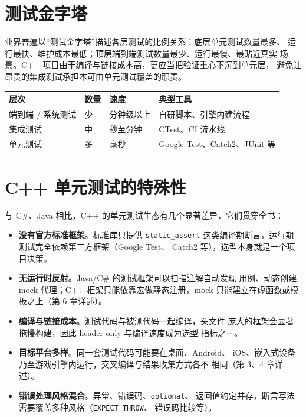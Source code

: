 \documentclass[12pt,a4paper,fontset=fandol]{ctexbook}
\begin{document}
\section{测试金字塔}

业界普遍以“测试金字塔”描述各层测试的比例关系：底层单元测试数量最多、
运行最快、维护成本最低；顶层端到端测试数量最少、运行最慢、最贴近真实
场景。C++ 项目由于编译与链接成本高，更应当把验证重心下沉到单元层，
避免让昂贵的集成测试承担本可由单元测试覆盖的职责。

\begin{center}
\scriptsize
\setlength{\tabcolsep}{4pt}
\begin{tabular}{llll}
\toprule
层次 & 数量 & 速度 & 典型工具 \\
\midrule
端到端 / 系统测试 & 少 & 分钟级以上 & 自研脚本、引擎内建流程 \\
集成测试 & 中 & 秒至分钟 & CTest、CI 流水线 \\
单元测试 & 多 & 毫秒 & Google Test、Catch2、JUnit 等 \\
\bottomrule
\end{tabular}
\end{center}

\section{C++ 单元测试的特殊性}

与 C\#、Java 相比，C++ 的单元测试生态有几个显著差异，它们贯穿全书：

\begin{itemize}
  \item \textbf{没有官方标准框架}。标准库只提供 \texttt{static\_assert}
        这类编译期断言，运行期测试完全依赖第三方框架（Google Test、
        Catch2 等），选型本身就是一个项目决策。
  \item \textbf{无运行时反射}。Java/C\# 的测试框架可以扫描注解自动发现
        用例、动态创建 mock 代理；C++ 框架只能依靠宏做静态注册，mock
        只能建立在虚函数或模板之上（第 6 章详述）。
  \item \textbf{编译与链接成本}。测试代码与被测代码一起编译，头文件
        庞大的框架会显著拖慢构建，因此 header-only 与编译速度成为选型
        指标之一。
  \item \textbf{目标平台多样}。同一套测试代码可能要在桌面、Android、
        iOS、嵌入式设备乃至游戏引擎内运行，交叉编译与结果收集方式各不
        相同（第 3、4 章详述）。
  \item \textbf{错误处理风格混合}。异常、错误码、\texttt{optional}、
        返回值约定并存，断言写法需要覆盖多种风格（\texttt{EXPECT\_THROW}、
        错误码比较等）。
\end{itemize}
\end{document}
